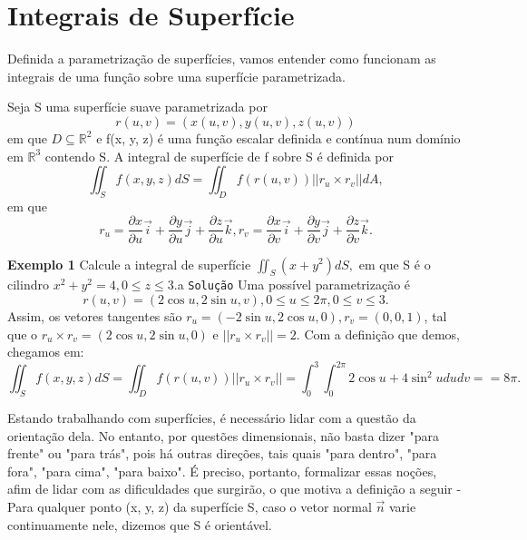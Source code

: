 
\maketitle

\section*{Integrais de Superf\'icie}

Definida a parametriza\c c\~ao de superf\'icies, vamos entender como funcionam as integrais de uma fun\c c\~ao
sobre uma superf\'icie parametrizada.

    Seja S uma superf\'icie suave parametrizada por 
    $$
        r(u, v) = (x(u, v), y(u, v), z(u, v))
    $$
    em que $D\subseteq\mathbb{R}^2$ e f(x, y, z) \'e uma fun\c c\~ao escalar definida e cont\'inua num dom\'inio
em $\mathbb{R}^3$ contendo S. A integral de superf\'icie de f sobre S \'e definida por 
    $$
        \iint_Sf(x, y, z)dS = \iint_D f(r(u, v))||r_u\times{r_v}||dA,
    $$
em que 
    $$
        r_u = \frac{\partial{x}}{\partial u}\vec{i} + \frac{\partial{y}}{\partial u}\vec{j} + \frac{\partial{z}}{\partial u}\vec{k},
        r_v =  \frac{\partial{x}}{\partial v}\vec{i} + \frac{\partial{y}}{\partial v}\vec{j} + \frac{\partial{z}}{\partial v}\vec{k}.
    $$

    \textbf{Exemplo 1} Calcule a integral de superf\'icie $\iint_S (x+y^2)dS,$ em que S \'e o cilindro 
$x^2 + y^2 = 4, 0 \leq z \leq 3$.a
\texttt{Solu\c c\~ao} Uma poss\'ivel parametriza\c c\~ao \'e 
    $$
        r(u, v) = (2\cos{u}, 2\sin{u}, v), 0 \leq u \leq 2\pi, 0 \leq v \leq 3.
    $$
    Assim, os vetores tangentes s\~ao $r_u = (-2\sin{u}, 2\cos{u}, 0), r_v = (0, 0, 1)$, tal que o 
$r_u \times r_v = (2\cos{u}, 2\sin{u}, 0)$ e $||r_u \times r_v|| = 2$. Com a defini\c c\~ao que demos, chegamos
em:
    $$
        \iint_S f(x, y, z)dS = \iint_D f(r(u, v))||r_u \times r_v|| = \int_0^3\int_0^{2\pi}2\cos{u} + 4\sin^2{u}dudv =
    = 8\pi.
    $$

    Estando trabalhando com superf\'icies, \'e necess\'ario lidar com a quest\~ao da orienta\c c\~ao dela. No entanto,
por quest\~oes dimensionais, n\~ao basta dizer "para frente" ou "para tr\'as", pois h\'a outras dire\c c\~oes, tais
quais "para dentro", "para fora", "para cima", "para baixo". \'E preciso, portanto, formalizar essas no\c c\~oes, afim
de lidar com as dificuldades que surgir\~ao, o que motiva a defini\c c\~ao a seguir - Para qualquer ponto (x, y, z) da
superf\'icie S, caso o vetor normal $\vec{n}$ varie continuamente nele, dizemos que S \'e orient\'avel.

